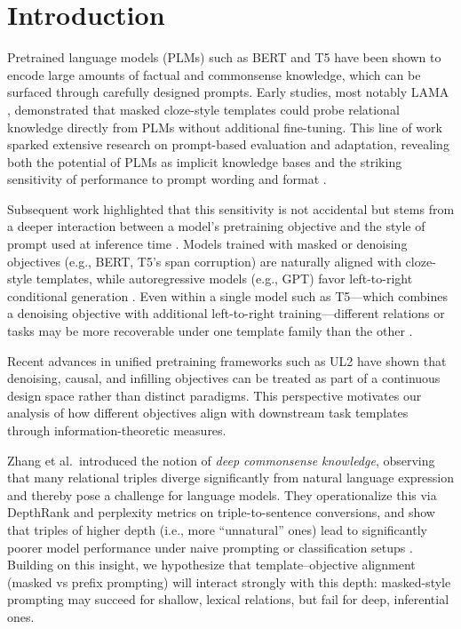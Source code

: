 \documentclass{i4c-en}
\begin{document}
\section{Introduction}
Pretrained language models (PLMs) such as BERT \cite{devlin2019bert} and T5 \cite{raffel2020exploring} have been shown to encode large amounts of factual and commonsense knowledge, which can be surfaced through carefully designed prompts. Early studies, most notably LAMA \cite{petroni2019language}, demonstrated that masked cloze-style templates could probe relational knowledge directly from PLMs without additional fine-tuning. This line of work sparked extensive research on prompt-based evaluation and adaptation, revealing both the potential of PLMs as implicit knowledge bases and the striking sensitivity of performance to prompt wording and format \cite{jiang2020can,shin2020autoprompt,gao2021making}.

Subsequent work highlighted that this sensitivity is not accidental but stems from a deeper interaction between a model’s pretraining objective and the style of prompt used at inference time \cite{ul2, pouramini2024matching, brown2020language, liu2021pretrain}. Models trained with masked or denoising objectives (e.g., BERT, T5’s span corruption) are naturally aligned with cloze-style templates, while autoregressive models (e.g., GPT) favor left-to-right conditional generation \cite{raffel2020exploring,radford2019language}. Even within a single model such as T5—which combines a denoising objective with additional left-to-right training—different relations or tasks may be more recoverable under one template family than the other \cite{pouramini2024matching, ul2}. 

Recent advances in unified pretraining frameworks such as UL2 \cite{ul2} have shown that denoising, causal, and infilling objectives can be treated as part of a continuous design space rather than distinct paradigms. This perspective motivates our analysis of how different objectives align with downstream task templates through information-theoretic measures.

Zhang et al.\  introduced the notion of \emph{deep commonsense knowledge}, observing that many relational triples diverge significantly from natural language expression and thereby pose a challenge for language models. They operationalize this via DepthRank and perplexity metrics on triple-to-sentence conversions, and show that triples of higher depth (i.e., more “unnatural” ones) lead to significantly poorer model performance under naive prompting or classification setups \cite{zhang2021alleviating}. Building on this insight, we hypothesize that template–objective alignment (masked vs prefix prompting) will interact strongly with this depth: masked-style prompting may succeed for shallow, lexical relations, but fail for deep, inferential ones.  
\end{document}

